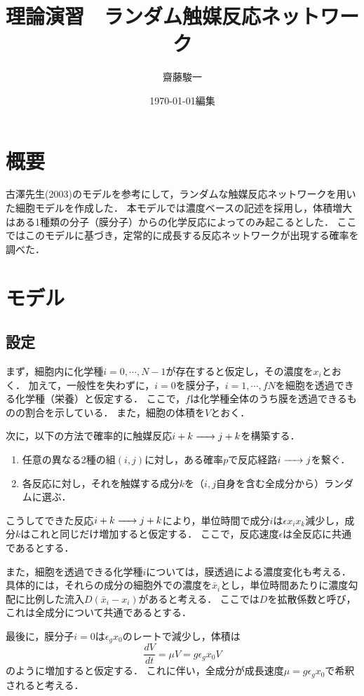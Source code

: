 \documentclass[a4paper,11pt]{jsarticle}
\begin{document}
\title{理論演習　ランダム触媒反応ネットワーク}
\author{齋藤駿一}
\date{\today 編集}
\maketitle

\section{概要}
古澤先生(2003)のモデルを参考にして，ランダムな触媒反応ネットワークを用いた細胞モデルを作成した．
本モデルでは濃度ベースの記述を採用し，体積増大はある1種類の分子（膜分子）からの化学反応によってのみ起こるとした．
ここではこのモデルに基づき，定常的に成長する反応ネットワークが出現する確率を調べた．

\section{モデル}
\subsection{設定}
まず，細胞内に化学種$i=0,\cdots, N-1$が存在すると仮定し，その濃度を$x_i$とおく．
加えて，一般性を失わずに，$i=0$を膜分子，$i=1,\cdots, fN$を細胞を透過できる化学種（栄養）と仮定する．
ここで，$f$は化学種全体のうち膜を透過できるものの割合を示している．
また，細胞の体積を$V$とおく．

次に，以下の方法で確率的に触媒反応$\ce{$i$ + $k$ -> $j$ + $k$}$を構築する．
\begin{enumerate}
  \item 任意の異なる2種の組$(i,j)$に対し，ある確率$p$で反応経路$\ce{$i$ -> $j$}$を繋ぐ．
  \item 各反応に対し，それを触媒する成分$k$を（$i,j$自身を含む全成分から）ランダムに選ぶ．
\end{enumerate}
こうしてできた反応$\ce{$i$ + $k$ -> $j$ + $k$}$により，単位時間で成分$i$は$\epsilon x_i x_k$減少し，成分$k$はこれと同じだけ増加すると仮定する．
ここで，反応速度$\epsilon$は全反応に共通であるとする．

また，細胞を透過できる化学種$i$については，膜透過による濃度変化も考える．
具体的には，それらの成分の細胞外での濃度を$\bar{x}_i$とし，単位時間あたりに濃度勾配に比例した流入$D(\bar{x}_i - x_i)$があると考える．
ここでは$D$を拡散係数と呼び，これは全成分について共通であるとする．

最後に，膜分子$i=0$は$\epsilon_g x_0$のレートで減少し，体積は
\begin{equation}
  \frac{dV}{dt} = \mu V = g \epsilon_g x_0 V
\end{equation}
のように増加すると仮定する．
これに伴い，全成分が成長速度$\mu=g \epsilon_g x_0$で希釈されると考える．
\end{document}
